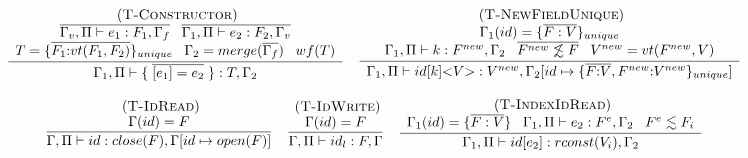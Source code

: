 \documentclass[preprint]{sigplanconf}
\newcommand{\mylabel}[1]{\; (\textsc{#1})}
\newcommand{\env}{\Gamma}
\newcommand{\penv}{\Pi}
\begin{document}
\begin{figure*}[t]
{\small
\[
\begin{array}{c}
\begin{array}{c}
\mylabel{T-Constructor}\\
\dfrac{\begin{array}{c}
	\overline{\env_v, \penv \vdash e_1: F_1, \env_f}
	\;\;\;
\overline{\env_1, \penv \vdash e_2: F_2, \env_v}	\\
	T = \{\overline{F_1{:}vt(F_1,F_2)}\}_{unique} \;\;\;
	\env_{2} = merge(\overline{\env_{f}}) \;\;\; wf(T)
	\end{array}}
{\env_{1}, \penv \vdash \{\;\overline{[e_{1}] = e_{2}}\;\}:T, \env_{2}}
\end{array}
\begin{array}{c}
\mylabel{T-NewFieldUnique}\\
\dfrac{\begin{array}{c}
	\env_{1}(id) = \{ \overline{F:V} \}_{unique}\\
	\env_{1}, \penv \vdash k:F^{new}, \env_{2} \;\;\;
	\overline{F^{new} \not\lesssim F} \;\;\;
	V^{new} = vt(F^{new}, V)
	\end{array}}
{\begin{array}{l}
	\env_{1}, \penv \vdash id[k] {<}V{>}:V^{new},
	\env_{2}[id \mapsto \{ \overline{F{:}V}, F^{new}{:}V^{new}\}_{unique}]
	\end{array}}
\end{array}\\\\
\begin{array}{c}
\mylabel{T-IdRead}\\
\dfrac{\env(id) = F}
{\env, \penv \vdash id:close(F), \env[id \mapsto open(F)]}
\end{array}
\begin{array}{c}
\mylabel{T-IdWrite}\\
\dfrac{\env(id) = F}
{\env, \penv \vdash id_{l}:F, \env}
\end{array}
\begin{array}{c}
\mylabel{T-IndexIdRead}\\
\dfrac{\begin{array}{c}
	\env_{1}(id) = \{\overline{F:V}\} \;\;\;
	\env_{1}, \penv \vdash e_{2}:F^e, \env_{2} \;\;\;
	 F^e \lesssim F_{i}
	\end{array}}
{\env_{1}, \penv \vdash id[e_{2}]:rconst(V_{i}), \env_{2}}
\end{array}
\\ \\
\begin{array}{c}

\end{array}
\end{array}\]}
\end{figure*}
\end{document}
